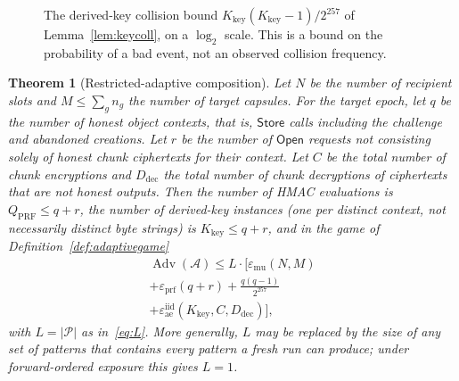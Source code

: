 \documentclass[pdflatex,sn-mathphys-num,twocolumn]{sn-jnl}
\theoremstyle{plain}
\newtheorem{theorem}{Theorem}
\theoremstyle{definition}
\newcommand{\Adv}{\operatorname{Adv}}
\begin{document}
\begin{figure}[htbp]
\centering

\caption{The derived-key collision bound $K_{\mathrm{key}}(K_{\mathrm{key}}-1)/2^{257}$ of Lemma~\ref{lem:keycoll}, on a $\log_2$ scale. This is a bound on the probability of a bad event, not an observed collision frequency.}\label{fig:keycoll}
\end{figure}

\begin{keyresult}
\begin{theorem}[Restricted-adaptive composition]\label{thm:adaptive}
Let $N$ be the number of recipient slots and $M\le\sum_gn_g$ the number of target capsules. For the target epoch, let $q$ be the number of honest object contexts, that is, $\mathsf{Store}$ calls including the challenge and abandoned creations. Let $r$ be the number of $\mathsf{Open}$ requests not consisting solely of honest chunk ciphertexts for their context. Let $C$ be the total number of chunk encryptions and $D_{\mathrm{dec}}$ the total number of chunk decryptions of ciphertexts that are not honest outputs. Then the number of HMAC evaluations is $Q_{\mathrm{PRF}}\le q+r$, the number of derived-key \emph{instances} (one per distinct context, not necessarily distinct byte strings) is $K_{\mathrm{key}}\le q+r$, and in the game of Definition~\ref{def:adaptivegame}
\begin{multline}\label{eq:adaptive}
 \Adv(\mathcal A)\le L\cdot\Big[\varepsilon_{\mathrm{mu}}(N,M)\\
 +\varepsilon_{\mathrm{prf}}(q+r)+\frac{q(q-1)}{2^{257}}\\
 +\varepsilon^{\mathrm{iid}}_{\mathrm{ae}}(K_{\mathrm{key}},C,D_{\mathrm{dec}})\Big],
\end{multline}
with $L=|\mathcal P|$ as in~\eqref{eq:L}. More generally, $L$ may be replaced by the size of any set of patterns that contains every pattern a fresh run can produce; under forward-ordered exposure this gives $L=1$.
\end{theorem}
\end{keyresult}
\end{document}
